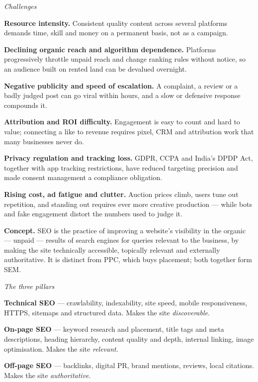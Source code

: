 \begin{qlist}
\textit{Challenges}
\begin{apts}\setcounter{enumi}{6}
\item \textbf{Resource intensity.} Consistent quality content across several
      platforms demands time, skill and money on a permanent basis, not as a
      campaign.
\item \textbf{Declining organic reach and algorithm dependence.} Platforms
      progressively throttle unpaid reach and change ranking rules without
      notice, so an audience built on rented land can be devalued overnight.
\item \textbf{Negative publicity and speed of escalation.} A complaint, a
      review or a badly judged post can go viral within hours, and a slow or
      defensive response compounds it.
\item \textbf{Attribution and ROI difficulty.} Engagement is easy to count and
      hard to value; connecting a like to revenue requires pixel, CRM and
      attribution work that many businesses never do.
\item \textbf{Privacy regulation and tracking loss.} GDPR, CCPA and India's
      DPDP Act, together with app tracking restrictions, have reduced targeting
      precision and made consent management a compliance obligation.
\item \textbf{Rising cost, ad fatigue and clutter.} Auction prices climb, users
      tune out repetition, and standing out requires ever more creative
      production --- while bots and fake engagement distort the numbers used to
      judge it.
\end{apts}

\textbf{Concept.} SEO is the practice of improving a website's visibility in
the organic --- unpaid --- results of search engines for queries relevant to the
business, by making the site technically accessible, topically relevant and
externally authoritative. It is distinct from PPC, which buys placement; both
together form SEM.

\textit{The three pillars}
\begin{apts}
\item \textbf{Technical SEO} --- crawlability, indexability, site speed, mobile
      responsiveness, HTTPS, sitemaps and structured data. Makes the site
      \emph{discoverable}.
\item \textbf{On-page SEO} --- keyword research and placement, title tags and
      meta descriptions, heading hierarchy, content quality and depth, internal
      linking, image optimisation. Makes the site \emph{relevant}.
\item \textbf{Off-page SEO} --- backlinks, digital PR, brand mentions, reviews,
      local citations. Makes the site \emph{authoritative}.
\end{apts}


\end{qlist}

